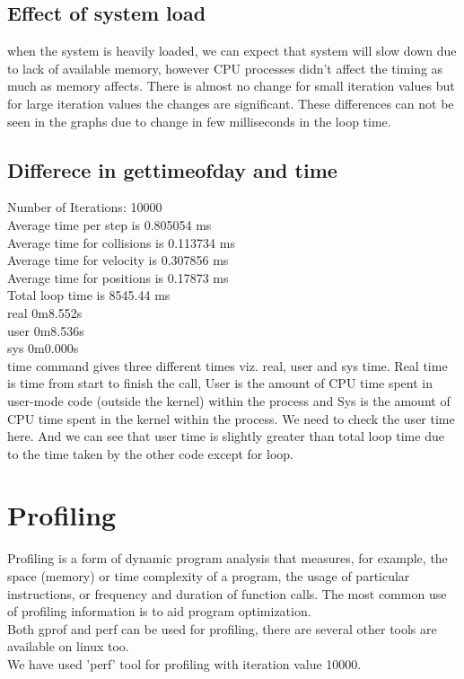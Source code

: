 \documentclass[11pt]{article}
\begin{document}
\subsection{Effect of system load}
when the system is heavily loaded, we can expect that system will slow down due to lack of available memory,  however CPU processes didn't affect the timing as much as memory affects. There is almost no change for small iteration values but for large iteration values the changes are significant.
These differences can not be seen in the graphs due to change in few milliseconds in the loop time.
\subsection{Differece in gettimeofday and time}
Number of Iterations: 10000\\
Average time per step is 0.805054 ms\\
Average time for collisions is 0.113734 ms\\
Average time for velocity is 0.307856 ms\\
Average time for positions is 0.17873 ms\\
Total loop time is 8545.44 ms\\
real	0m8.552s\\
user	0m8.536s\\
sys	0m0.000s\\

time command gives three different times viz. real, user and sys time. Real time is time from start to finish the call, User is the amount of CPU time spent in user-mode code (outside the kernel) within the process and Sys is the amount of CPU time spent in the kernel within the process. We need to check the user time here. And we can see that user time is slightly greater than total loop time due to the time taken by the other code except for loop. 

\section{Profiling}
Profiling is a form of dynamic program analysis that measures, for example, the space (memory) or time complexity of a program, the usage of particular instructions, or frequency and duration of function calls. The most common use of profiling information is to aid program optimization.\\
Both gprof and perf can be used for profiling, there are several other tools are available on linux too.\\
We have used 'perf' tool for profiling with iteration value 10000.
\end{document}
